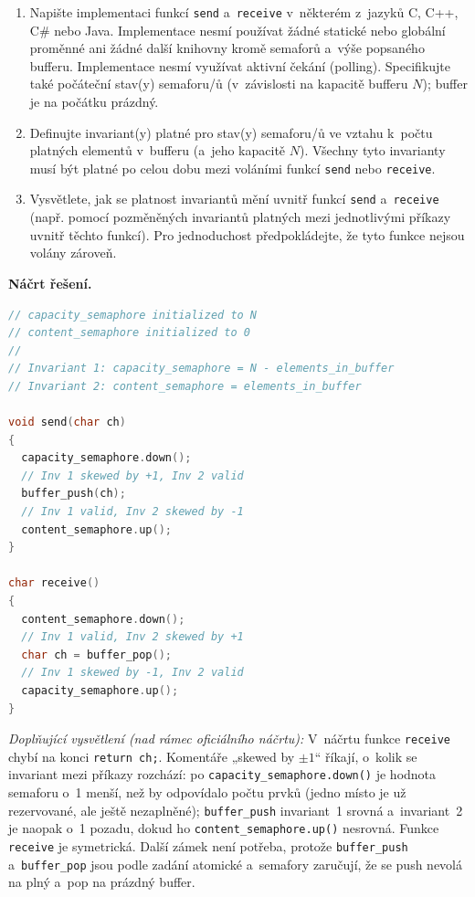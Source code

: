 \begin{enumerate}
\item Napište implementaci funkcí \texttt{send} a~\texttt{receive} v~některém z~jazyků C,
  C++, C\# nebo Java. Implementace nesmí používat žádné statické nebo globální proměnné
  ani žádné další knihovny kromě semaforů a~výše popsaného bufferu. Implementace nesmí
  využívat aktivní čekání (polling). Specifikujte také počáteční stav(y) semaforu/ů
  (v~závislosti na kapacitě bufferu $N$); buffer je na počátku prázdný.
\item Definujte invariant(y) platné pro stav(y) semaforu/ů ve vztahu k~počtu platných
  elementů v~bufferu (a~jeho kapacitě $N$). Všechny tyto invarianty musí být platné po
  celou dobu mezi voláními funkcí \texttt{send} nebo \texttt{receive}.
\item Vysvětlete, jak se platnost invariantů mění uvnitř funkcí \texttt{send}
  a~\texttt{receive} (např. pomocí pozměněných invariantů platných mezi jednotlivými
  příkazy uvnitř těchto funkcí). Pro jednoduchost předpokládejte, že tyto funkce nejsou
  volány zároveň.
\end{enumerate}

\medskip
\noindent\textbf{Náčrt řešení.}\par
\begin{lstlisting}[language=C]
// capacity_semaphore initialized to N
// content_semaphore initialized to 0
//
// Invariant 1: capacity_semaphore = N - elements_in_buffer
// Invariant 2: content_semaphore = elements_in_buffer

void send(char ch)
{
  capacity_semaphore.down();
  // Inv 1 skewed by +1, Inv 2 valid
  buffer_push(ch);
  // Inv 1 valid, Inv 2 skewed by -1
  content_semaphore.up();
}

char receive()
{
  content_semaphore.down();
  // Inv 1 valid, Inv 2 skewed by +1
  char ch = buffer_pop();
  // Inv 1 skewed by -1, Inv 2 valid
  capacity_semaphore.up();
}
\end{lstlisting}

\medskip
\noindent\textit{Doplňující vysvětlení (nad rámec oficiálního náčrtu):} V~náčrtu funkce
\texttt{receive} chybí na konci \texttt{return ch;}. Komentáře „skewed by $\pm1$`` říkají, o~kolik
se invariant mezi příkazy rozchází: po \texttt{capacity\_semaphore.down()} je hodnota semaforu o~1
menší, než by odpovídalo počtu prvků (jedno místo je už rezervované, ale ještě nezaplněné);
\texttt{buffer\_push} invariant~1 srovná a~invariant~2 je naopak o~1 pozadu, dokud ho
\texttt{content\_semaphore.up()} nesrovná. Funkce \texttt{receive} je symetrická. Další zámek není
potřeba, protože \texttt{buffer\_push} a~\texttt{buffer\_pop} jsou podle zadání atomické
a~semafory zaručují, že se push nevolá na plný a~pop na prázdný buffer.
